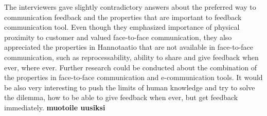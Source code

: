 \documentclass[english,12pt,a4paper,pdftex]{article}
\begin{document}
The interviewers gave slightly contradictory answers about the preferred way to communication feedback and the properties that are important to feedback communication tool. Even though they emphasized importance of physical proximity to customer and valued face-to-face communication, they also appreciated the properties in Hannotaatio that are not available in face-to-face communication, such as reprocessability, ability to share and give feedback when ever, where ever. Further research could be conducted about the combination of the properties in face-to-face communication and e-communication tools. It would be also very interesting to push the limits of human knowledge and try to solve the dilemma, how to be able to give feedback when ever, but get feedback immediately. \textbf{muotoile uusiksi}

\end{document}
